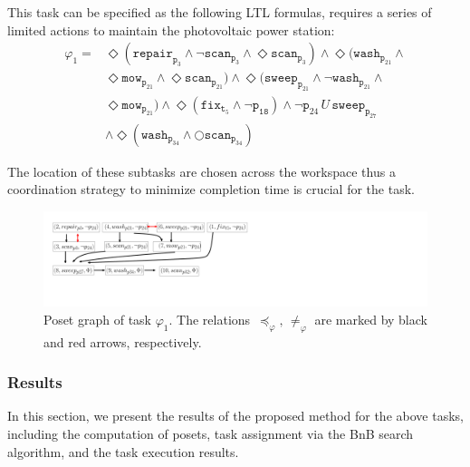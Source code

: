 This task can be specified as the following LTL formulas, 
requires a series of limited actions to 
maintain the photovoltaic power station:
\begin{equation}\label{eq:task1}
  \begin{aligned}
\varphi_1 = & \Diamond(\texttt{repair}_{\texttt{p}_{3}} \wedge \lnot \texttt{scan}_{\texttt{p}_3} \wedge\Diamond \texttt{scan}_{\texttt{p}_3})
\wedge \Diamond (\texttt{wash}_{\texttt{p}_{21}} \wedge \\
&\Diamond \texttt{mow}_{\texttt{p}_{21}} \wedge \Diamond \texttt{scan}_{\texttt{p}_{21}}) \wedge \Diamond ( \texttt{sweep}_{\texttt{p}_{21}} \wedge \lnot \texttt{wash}_{\texttt{p}_{21}} \wedge\\
& \Diamond \texttt{mow}_{\texttt{p}_{21}}) \wedge \Diamond(\texttt{fix}_{\texttt{t}_5} \wedge \lnot \texttt{p}_{\texttt{18}}) \wedge \lnot \texttt{p}_{24} \,U \, \texttt{sweep}_{\texttt{p}_{27}} \\
&\wedge \Diamond (\texttt{wash}_{\texttt{p}_{34}} \wedge \bigcirc \texttt{scan}_{\texttt{p}_{34}})
\end{aligned}
\end{equation}

The location of these subtasks are chosen across the workspace
thus a coordination strategy to minimize completion time is crucial for the task.



\begin{figure}[t!] 
		\centering%
		\includegraphics[height = 0.12 \textwidth]{figures/simulation/taskfinal/ipe_poset_graph.pdf}
	\caption{Poset graph of task $\varphi_1$.
          The relations~$\preceq_\varphi,\, \neq_{\varphi}$ are marked
          by black and red arrows, respectively.}
       \label{fig:task12-posets}
\end{figure}

\subsubsection{Results}\label{subsubsec:results}
In this section, we present the results of the proposed method for
the above tasks, including the computation of posets,
task assignment via the BnB search algorithm, and the task execution results.


